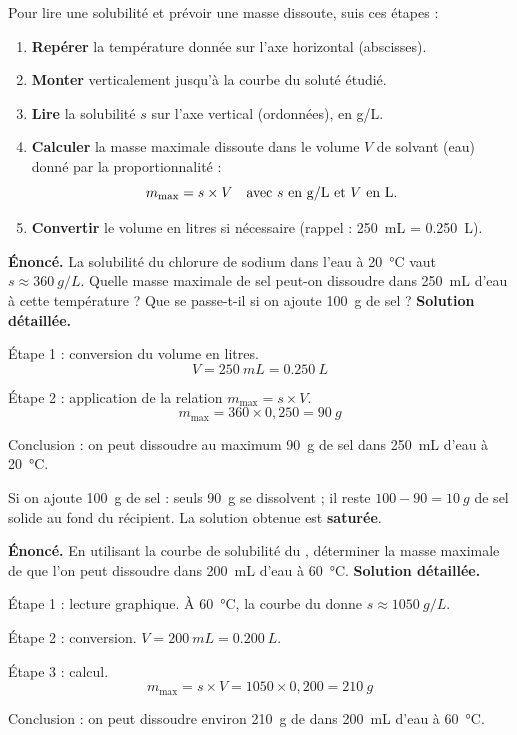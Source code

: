 \documentclass[11pt]{article}
\begin{document}
\begin{methode}
Pour lire une solubilité et prévoir une masse dissoute, suis ces étapes :
\begin{enumerate}
\item \textbf{Repérer} la température donnée sur l'axe horizontal (abscisses).
\item \textbf{Monter} verticalement jusqu'à la courbe du soluté étudié.
\item \textbf{Lire} la solubilité $s$ sur l'axe vertical (ordonnées), en \si{g/L}.
\item \textbf{Calculer} la masse maximale dissoute dans le volume $V$ de solvant (eau) donné par la proportionnalité :
\[ m_{\max} = s \times V \quad \text{avec } s \text{ en \si{g/L} et } V \text{ en L.} \]
\item \textbf{Convertir} le volume en litres si nécessaire (rappel : \SI{250}{mL} = \SI{0,250}{L}).
\end{enumerate}
\end{methode}

\begin{exoresolu}
\textbf{Énoncé.} La solubilité du chlorure de sodium dans l'eau à \SI{20}{\celsius} vaut $s \approx \SI{360}{g/L}$. Quelle masse maximale de sel peut-on dissoudre dans \SI{250}{mL} d'eau à cette température ? Que se passe-t-il si on ajoute \SI{100}{g} de sel ?
\tcblower
\textbf{Solution détaillée.}

Étape 1 : conversion du volume en litres.
\[ V = \SI{250}{mL} = \SI{0,250}{L} \]

Étape 2 : application de la relation $m_{\max} = s \times V$.
\[ m_{\max} = 360 \times 0{,}250 = \SI{90}{g} \]

Conclusion : on peut dissoudre au maximum \SI{90}{g} de sel dans \SI{250}{mL} d'eau à \SI{20}{\celsius}.

Si on ajoute \SI{100}{g} de sel : seuls \SI{90}{g} se dissolvent ; il reste $100 - 90 = \SI{10}{g}$ de sel solide au fond du récipient. La solution obtenue est \textbf{saturée}.
\end{exoresolu}

\begin{exoresolu}
\textbf{Énoncé.} En utilisant la courbe de solubilité du , déterminer la masse maximale de  que l'on peut dissoudre dans \SI{200}{mL} d'eau à \SI{60}{\celsius}.
\tcblower
\textbf{Solution détaillée.}

Étape 1 : lecture graphique. À \SI{60}{\celsius}, la courbe du  donne $s \approx \SI{1050}{g/L}$.

Étape 2 : conversion. $V = \SI{200}{mL} = \SI{0,200}{L}$.

Étape 3 : calcul.
\[ m_{\max} = s \times V = 1050 \times 0{,}200 = \SI{210}{g} \]

Conclusion : on peut dissoudre environ \SI{210}{g} de  dans \SI{200}{mL} d'eau à \SI{60}{\celsius}.
\end{exoresolu}
\end{document}

